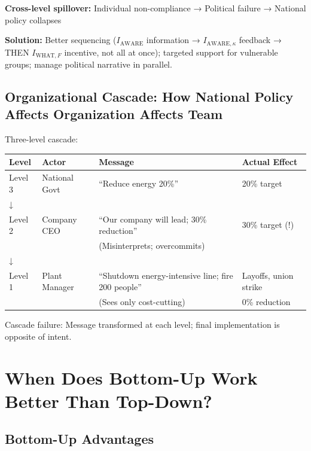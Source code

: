 \textbf{Cross-level spillover:} Individual non-compliance → Political failure → National policy collapses

\textbf{Solution:} Better sequencing ($I_{\text{AWARE}}$ information → $I_{\text{AWARE},\kappa}$ feedback → THEN $I_{\text{WHAT},F}$ incentive, not all at once); targeted support for vulnerable groups; manage political narrative in parallel.

\subsection{Organizational Cascade: How National Policy Affects Organization Affects Team}

Three-level cascade:

\begin{center}
\begin{tabular}{@{}llll@{}}
\toprule
\textbf{Level} & \textbf{Actor} & \textbf{Message} & \textbf{Actual Effect} \\
\midrule
Level 3 & National Govt & ``Reduce energy 20\%'' & 20\% target \\
↓ & & & \\
Level 2 & Company CEO & ``Our company will lead; 30\% reduction'' & 30\% target (!)  \\
& & (Misinterprets; overcommits) & \\
↓ & & & \\
Level 1 & Plant Manager & ``Shutdown energy-intensive line; fire 200 people'' & Layoffs, union strike \\
& & (Sees only cost-cutting) & 0\% reduction \\
\midrule
\end{tabular}
\end{center}

Cascade failure: Message transformed at each level; final implementation is opposite of intent.


\section{When Does Bottom-Up Work Better Than Top-Down?}
\label{sec:bottom-up-top-down}

\subsection{Bottom-Up Advantages}

